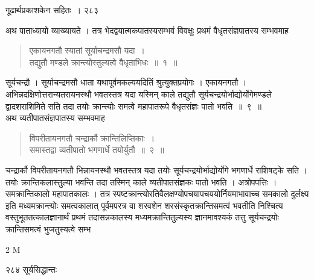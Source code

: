 \documentclass[11pt, openany]{book}
\begin{document}
\newpage

\hspace{3cm} गूढार्थप्रकाशकेन सहितः~। \hfill २८३
\vspace{1cm}


\noindent अथ पाताध्यायो व्याख्यायते । तत्र भेदद्वयात्मकपातस्यसम्भवं विवक्षुः प्रथमं वैधृतसंज्ञपातस्य सम्भवमाह \textendash

\begin{quote}
{\ssi एकायनगतौ स्यातां सूर्याचन्द्रमसौ यदा~।\\
तद्युतौ मण्डले क्रान्त्योस्तुल्यत्वे वैधृताभिधः~॥~१~॥ }
\end{quote}

 सूर्यचन्द्रौ । सूर्याचन्द्रमसौ धाता यथापूर्वमकल्ययदितिं श्रुत्युक्तप्रयोगः । एकायनगतौ । अभिन्नदक्षिणोत्तरान्यतरायनस्थौ भवतस्तत्र यदा यस्मिन् काले तद्युतौ सूर्यचन्द्रयोर्भाद्योर्योगेमण्डले द्वादशराशिमिते सति तदा तयोः क्रान्त्योः समत्वे महापातरूपे वैधृतसंज्ञः पातो भवति~॥~९~॥\\
 \noindent अथ व्यतीपातसंज्ञपातस्य सम्भवमाह \textendash
 

\begin{quote}
{\ssi विपरीतायनगतौ चन्द्रार्कौ क्रान्तिलिप्तिकाः~।\\
समास्तद्वा व्यतीपातो भगणार्धे तयोर्युतौ~॥~२~॥}
\end{quote}

 चन्द्रार्कौ विपरीतायनगतौ भिन्नायनस्थौ भवतस्तत्र यदा तयोः सूर्यचन्द्रयोर्भाद्योर्योगे भगणार्धे राशिषट्के सति । तयोः क्रान्तिकलास्तुल्या भवन्ति तदा तस्मिन् काले व्यतीपातसंज्ञकः पातो भवति । अत्रोपपत्तिः । समक्रान्तिकालो महापातकालः । तत्र स्पष्टक्रान्त्योरतिवैलक्षण्योपचयापचययोर्नियमाभावाच्च समकालो दुर्लक्ष्य इति मध्यमक्रान्त्योः समत्वकालात् पूर्वमपरत्र वा शरवशेन शरसंस्कृतक्रान्तिसमत्वं भवतीति निश्चित्य वस्तुभूततत्कालज्ञानार्थं प्रथमं तदासन्नकालस्य मध्यमक्रान्तितुल्यस्य ज्ञानमावश्यकं तत्तु सूर्यचन्द्रयोः क्रान्तिसमत्वं भुजतुस्यत्वे सम्भ \textendash

%

{\tiny{2 M}}

\newpage


\noindent २८४ \hspace{4cm} सूर्यसिद्धान्तः
\vspace{1cm}
\end{document}
